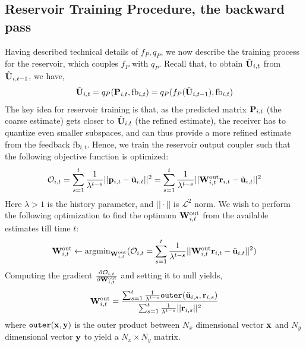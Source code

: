\documentclass[conference]{IEEEtran}
\begin{document}
{%
\subsection{Reservoir Training Procedure, the backward pass}
\label{train}
\noindent Having described technical details of $f_P,q_P$, we now describe the training process for the reservoir, which couples $f_P$ with $q_P$. Recall that, to obtain $\tilde{{\bf U}}_{i,t}$ from $\tilde{{\bf U}}_{i,t-1}$, we have,
\begin{equation}
\tilde{\bU}_{i,t}=q_P(\bP_{i,t},\text{fb}_{i,t})=q_P(f_P(\tilde{\bU}_{i,t-1}),\text{fb}_{i,t})
\label{fpqp}
\end{equation}
The key idea for reservoir training is that, as the predicted matrix ${\bf P}_{i,t}$ (the coarse estimate) gets closer to $\tilde{{\bf U}}_{i,t}$ (the refined estimate), the receiver has to quantize even smaller subspaces, and can thus provide a more refined estimate from the feedback $\text{fb}_{i,t}$.
Hence, we train the reservoir output coupler such that the following objective function is optimized:
\begin{equation}
\mathcal{O}_{i,t}=\sum_{s=1}^{t}\frac{1}{\lambda^{t-s}}||\bp_{i,t}-\tilde{\bu}_{i,t}||^2=\sum_{s=1}^{t}\frac{1}{\lambda^{t-s}}||\bW_{i,t}^{\text{out}}\br_{i,t}-\tilde{\bu}_{i,t}||^2
\label{oit}
\end{equation}
Here $\lambda>1$ is the history parameter, and $||\cdot||$ is $\mathcal{L}^2$ norm.
We wish to perform the following optimization to find the optimum ${\bf W}_{i,t}^{\text{out}}$ from the available estimates till time $t$:
\begin{equation}
\bW_{i,t}^{\text{out}}\gets\text{argmin}_{\bW_{i,t}^{\text{out}}}(\mathcal{O}_{i,t}=\sum_{s=1}^{t}\frac{1}{\lambda^{t-s}}||\bW_{i,t}^{\text{out}}\br_{i,t}-\tilde{\bu}_{i,t}||^2)
\label{getsOpt}
\end{equation}
Computing the gradient $\frac{\partial \mathcal{O}_{i,t}}{\partial {\bf W}_{i,t}^{\text{out}}}$ and setting it to null yields,
\begin{equation}
\bW_{i,t}^{\text{out}}=\frac{\sum_{s=1}^{t}\frac{1}{\lambda^{t-s}}\texttt{outer}(\tilde{\bu}_{i,s},\br_{i,s})}{\sum_{s=1}^{t}\frac{1}{\lambda^{t-s}}||\br_{i,s}||^2}
\label{backpass}
\end{equation}
where $\texttt{outer}({\bf x},{\bf y})$ is the outer product between $N_x$ dimensional vector ${\bf x}$ and $N_y$ dimensional vector ${\bf y}$ to yield a $N_x\times N_y$ matrix.
}
\end{document}
